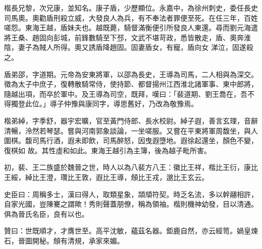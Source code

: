 \begin{pinyinscope}
 楷長兄黎，次兄康，並知名。康子盾，少歷顯位。永嘉中，為徐州刺史，委任長史司馬奧。奧勸盾刑殺立威，大發良人為兵，有不奉法者罪便至死。在任三年，百姓嗟怨。東海王越，盾妹夫也。越既薨，騎督滿衡便引所發良人東還。尋而劉元海遣將王桑、趙固向彭城，前鋒數騎至下邳，文武不堪苛政，悉皆散走，盾、奧奔淮陰，妻子為賊人所得。奧又誘盾降趙固。固妻盾女，有寵，盾向女
 涕泣，固遂殺之。



 盾弟邵，字道期。元帝為安東將軍，以邵為長史，王導為司馬，二人相與為深交。徵為太子中庶子，復轉散騎常侍，使持節、都督揚州江西淮北諸軍事、東中郎將，隨越出項，而卒於軍中。及王導為司空，既拜，嘆曰：「裴道期、劉王喬在，吾不得獨登此位。」導子仲豫與康同字，導思舊好，乃改為敬豫焉。



 楷弟綽，字季舒，器宇宏曠，官至黃門侍郎、長水校尉。綽子遐，善言玄理，音辭清暢，泠然若琴瑟。嘗與河南郭象談論，一坐嗟服。又嘗在平東將軍周馥坐，與人圍棋。馥司馬行酒，遐未即飲，司馬醉怒，因曳遐墮地。遐徐起還坐，顏色不變，復棋如
 故。其性虛和如此。東海王越引為主簿，後為越子毗所害。



 初，裴、王二族盛於魏晉之世，時人以為八裴方八王：徽比王祥，楷比王衍，康比王綏，綽比王澄，瓚比王敦，遐比王導，頠比王戎，邈比王玄云。



 史臣曰：周稱多士，漢曰得人，取類星象，頡頏符契。時乏名流，多以幹翮相許，自家光國，豈陳騫之謂歟！秀則聲蓋朋僚，稱為領袖。楷則機神幼發，目以清通。俱為晉氏名臣，良有以也。



 贊曰：世既順才，才膺世至。高平沈敏，蘊茲名器。鉅鹿自然，亦云經笥。媧皇煉石，晉圖開秘。頠有清規，承家來媚。



\end{pinyinscope}